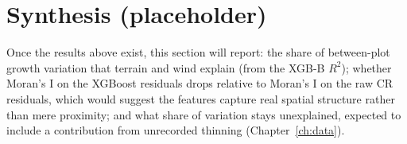 \section{Synthesis (placeholder)}

Once the results above exist, this section will report: the share of between-plot growth variation that terrain and wind explain (from the XGB-B $R^2$); whether Moran's I on the XGBoost residuals drops relative to Moran's I on the raw CR residuals, which would suggest the features capture real spatial structure rather than mere proximity; and what share of variation stays unexplained, expected to include a contribution from unrecorded thinning (Chapter~\ref{ch:data}).
